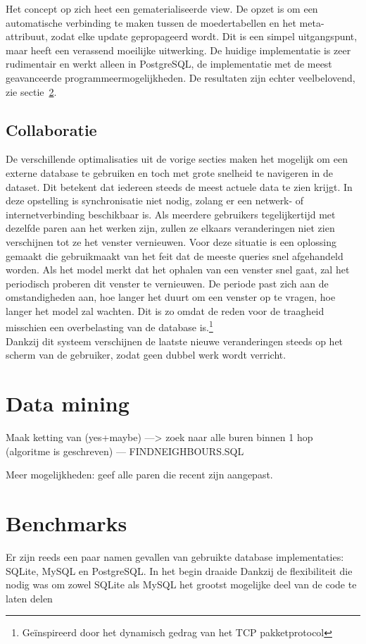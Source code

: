 Het concept op zich heet een gematerialiseerde view. De opzet is om een automatische verbinding te maken tussen de moedertabellen en het meta-attribuut, zodat elke update gepropageerd wordt. Dit is een simpel uitgangspunt, maar heeft een verassend moeilijke uitwerking. De huidige implementatie is zeer rudimentair en werkt alleen in PostgreSQL, de implementatie met de meest geavanceerde programmeermogelijkheden. De resultaten zijn echter veelbelovend, zie sectie~\ref{sec:benchmarks}.

\subsection{Collaboratie}
De verschillende optimalisaties uit de vorige secties maken het mogelijk om een externe database te gebruiken en toch met grote snelheid te navigeren in de dataset. Dit betekent dat iedereen steeds de meest actuele data te zien krijgt. In deze opstelling is synchronisatie niet nodig, zolang er een netwerk- of internetverbinding beschikbaar is. Als meerdere gebruikers tegelijkertijd met dezelfde paren aan het werken zijn, zullen ze elkaars veranderingen niet zien verschijnen tot ze het venster vernieuwen. Voor deze situatie is een oplossing gemaakt die gebruikmaakt van het feit dat de meeste queries snel afgehandeld worden. Als het model merkt dat het ophalen van een venster snel gaat, zal het periodisch proberen dit venster te vernieuwen. De periode past zich aan de omstandigheden aan, hoe langer het duurt om een venster op te vragen, hoe langer het model zal wachten. Dit is zo omdat de reden voor de traagheid misschien een overbelasting van de database is.\footnote{Ge\"inspireerd door het dynamisch gedrag van het TCP pakketprotocol}\\

Dankzij dit systeem verschijnen de laatste nieuwe veranderingen steeds op het scherm van de gebruiker, zodat geen dubbel werk wordt verricht.

\section{Data mining}
Maak ketting van (yes+maybe) ---> zoek naar alle buren binnen 1 hop (algoritme is geschreven) --- FINDNEIGHBOURS.SQL

Meer mogelijkheden: geef alle paren die recent zijn aangepast.


\section{Benchmarks}
\label{sec:benchmarks}
Er zijn reeds een paar namen gevallen van gebruikte database implementaties: SQLite, MySQL en PostgreSQL. In het begin draaide 
Dankzij de flexibiliteit die nodig was om zowel SQLite als MySQL het grootst mogelijke deel van de code te laten delen

